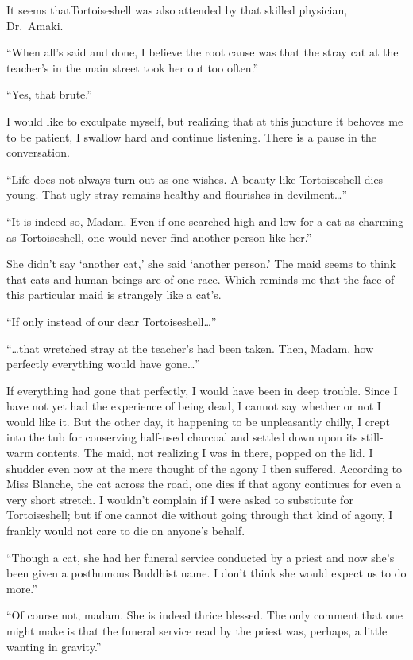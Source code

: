 \documentclass{book}
\begin{document}
It seems thatTortoiseshell was also attended by that skilled physician,
Dr.~Amaki.

``When all's said and done, I believe the root cause was that the stray
cat at the teacher's in the main street took her out too often.''

``Yes, that brute.''

I would like to exculpate myself, but realizing that at this juncture it
behoves me to be patient, I swallow hard and continue listening. There
is a pause in the conversation.

``Life does not always turn out as one wishes. A beauty like
Tortoiseshell dies young. That ugly stray remains healthy and flourishes
in devilment\ldots{}''

``It is indeed so, Madam. Even if one searched high and low for a cat as
charming as Tortoiseshell, one would never find another person like
her.''

She didn't say `another cat,' she said `another person.' The maid seems
to think that cats and human beings are of one race. Which reminds me
that the face of this particular maid is strangely like a cat's.

``If only instead of our dear Tortoiseshell\ldots{}''

``\ldots{}that wretched stray at the teacher's had been taken. Then,
Madam, how perfectly everything would have gone\ldots{}''

If everything had gone that perfectly, I would have been in deep
trouble. Since I have not yet had the experience of being dead, I cannot
say whether or not I would like it. But the other day, it happening to
be unpleasantly chilly, I crept into the tub for conserving half-used
charcoal and settled down upon its still-warm contents. The maid, not
realizing I was in there, popped on the lid. I shudder even now at the
mere thought of the agony I then suffered. According to Miss Blanche,
the cat across the road, one dies if that agony continues for even a
very short stretch. I wouldn't complain if I were asked to substitute
for Tortoiseshell; but if one cannot die without going through that kind
of agony, I frankly would not care to die on anyone's behalf.

``Though a cat, she had her funeral service conducted by a priest and
now she's been given a posthumous Buddhist name. I don't think she would
expect us to do more.''

``Of course not, madam. She is indeed thrice blessed. The only comment
that one might make is that the funeral service read by the priest was,
perhaps, a little wanting in gravity.''
\end{document}
